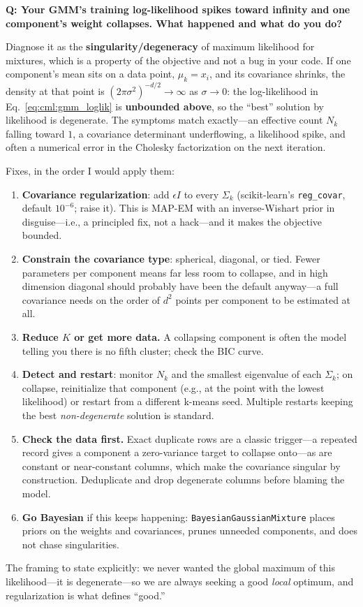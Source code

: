 \begin{interviewq}
\textbf{Q: Your GMM's training log-likelihood spikes toward infinity and one component's weight collapses. What happened and what do you do?}

 \quad {} \quad \badgefreq{\freqlow}

\stronganswer

Diagnose it as the \textbf{singularity/degeneracy} of maximum likelihood for mixtures, which is a property of the objective and not a bug in your code. If one component's mean sits on a data point, $\mu_k = x_i$, and its covariance shrinks, the density at that point is $(2\pi\sigma^2)^{-d/2}\to\infty$ as $\sigma\to0$: the log-likelihood in Eq.~\eqref{eq:cml:gmm_loglik} is \textbf{unbounded above}, so the ``best'' solution by likelihood is degenerate. The symptoms match exactly---an effective count $N_k$ falling toward $1$, a covariance determinant underflowing, a likelihood spike, and often a numerical error in the Cholesky factorization on the next iteration.

Fixes, in the order I would apply them:
\begin{enumerate}
    \item \textbf{Covariance regularization}: add $\epsilon I$ to every $\Sigma_k$ (scikit-learn's \texttt{reg\_covar}, default $10^{-6}$; raise it). This is MAP-EM with an inverse-Wishart prior in disguise---i.e., a principled fix, not a hack---and it makes the objective bounded.
    \item \textbf{Constrain the covariance type}: spherical, diagonal, or tied. Fewer parameters per component means far less room to collapse, and in high dimension diagonal should probably have been the default anyway---a full covariance needs on the order of $d^2$ points per component to be estimated at all.
    \item \textbf{Reduce $K$ or get more data.} A collapsing component is often the model telling you there is no fifth cluster; check the BIC curve.
    \item \textbf{Detect and restart}: monitor $N_k$ and the smallest eigenvalue of each $\Sigma_k$; on collapse, reinitialize that component (e.g., at the point with the lowest likelihood) or restart from a different k-means seed. Multiple restarts keeping the best \emph{non-degenerate} solution is standard.
    \item \textbf{Check the data first.} Exact duplicate rows are a classic trigger---a repeated record gives a component a zero-variance target to collapse onto---as are constant or near-constant columns, which make the covariance singular by construction. Deduplicate and drop degenerate columns before blaming the model.
    \item \textbf{Go Bayesian} if this keeps happening: \texttt{BayesianGaussianMixture} places priors on the weights and covariances, prunes unneeded components, and does not chase singularities.
\end{enumerate}
The framing to state explicitly: we never wanted the global maximum of this likelihood---it is degenerate---so we are always seeking a good \emph{local} optimum, and regularization is what defines ``good.''


\end{interviewq}
